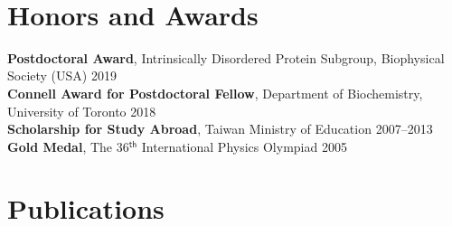 \documentclass[11pt]{../yhlcv}
\begin{document}
~\vspace{-3em}\\

\section*{Honors and Awards}

\noindent
{\bf Postdoctoral Award}, Intrinsically Disordered Protein Subgroup, Biophysical Society (USA) \hfill 2019 \\
{\bf Connell Award for Postdoctoral Fellow}, Department of Biochemistry, University of Toronto \hfill 2018 \\
{\bf Scholarship for Study Abroad}, Taiwan Ministry of Education  \hfill 2007--2013 \\
{\bf Gold Medal}, The 36$^{ \mathsf{th}}$ International Physics Olympiad \hfill 2005

\section*{Publications}
\end{document}

